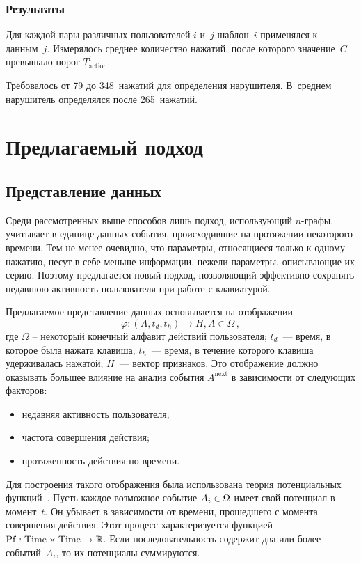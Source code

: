 \begin{multicols}{2}
\subsubsection{Результаты}

Для каждой пары различных пользователей $i$ и~$j$ шаблон~$i$
применялся к данным~$j$. Измерялось среднее количество нажатий,
после которого значение~$C$ превышало порог $T^i_{\mathrm{action}}$.

Требовалось от 79 до 348~нажатий для определения нарушителя. 
В~среднем нарушитель определялся после 265~нажатий.

\section{Предлагаемый подход}

\subsection{Представление данных}

Среди рассмотренных выше способов лишь подход, использующий
$n$-гра\-фы, учитывает в единице данных события, происходившие на
протяжении некоторого времени. Тем не менее очевидно, что параметры,
относящиеся только к одному нажатию, несут в себе меньше информации,
нежели параметры, описывающие их серию. Поэтому предлагается новый
подход, позволяющий эффективно сохранять недавнюю активность
пользователя при работе с клавиатурой.

Предлагаемое представление данных основывается на отображении
$$
\varphi: (A, t_d, t_h) \rightarrow H, A \in \Omega\,,
$$
где $\Omega$ -- некоторый конечный алфавит действий пользователя;
$t_d$~--- время, в которое была нажата клавиша; $t_h$~--- время, в
течение которого клавиша удерживалась нажатой; $H$~--- вектор
признаков. Это отображение должно оказывать большее влияние на
анализ события $A^{\mathrm{next}}$ в зависимости от  сле\-ду\-ющих
факторов:
\begin{itemize}
  \item недавняя активность пользователя;
  \item частота совершения действия;
  \item протяженность действия по времени.
\end{itemize}

Для построения такого отображения была использована теория
потенциальных функций~\cite{aizerman}. Пусть каждое возможное
событие $A_i \hm\in \Omega$ имеет свой потенциал в момент~$t$. Он
убывает в за\-ви\-си\-мости от времени, прошедшего с момента совершения
действия. Этот процесс характеризуется функцией $\mathrm{Pf}: \mathrm{Time} \times
\mathrm{Time} \hm\rightarrow \mathbb R$. Если последовательность содержит два
или более событий~$A_i$, то их потенциалы суммируются.


\end{multicols}
